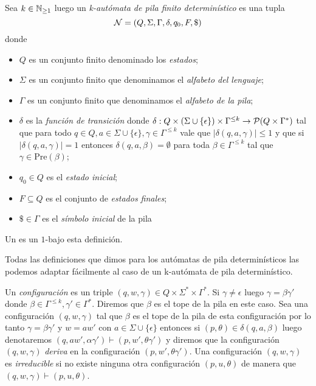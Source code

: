 \documentclass[tesis.tex]{subfiles}
\begin{document}
\begin{deff}
	Sea $k \in \mathbb{N}_{\ge 1}$ luego un \emph{k-autómata de pila finito determinístico} es una tupla 
	\[
	{\cal N } = (Q, \Sigma, \Gamma, \delta, q_0, F, \$)
	\]
	donde 
	\begin{itemize}
		\item $Q$ es un conjunto finito denominado los \emph{estados};
		\item $\Sigma$ es un conjunto finito que denominamos el \emph{alfabeto del lenguaje};
		\item $\Gamma$ es un conjunto finito que denominamos el \emph{alfabeto de la pila};
		\item $\delta$ es la \emph{función de transición} donde $\delta: Q  \times (\Sigma \cup \{ \epsilon \}) \times \Gamma^{\le k} \to {\cal P}(Q \times \Gamma^*)$
		tal que para todo $q \in Q, a \in \Sigma \cup \{\epsilon\}, \gamma \in \Gamma^{\le k}$ vale que $|\delta(q,a,\gamma)| \le 1$ y que si $|\delta(q,a,\gamma)| = 1$ entonces $\delta(q,a,\beta) = \emptyset$ para toda $\beta \in \Gamma^{\le k}$ tal que $\gamma \in \text{Pre}(\beta)$;
		\item $q_0 \in Q$ es el \emph{estado inicial};
		\item $F \subseteq Q$ es el conjunto de \emph{estados finales};
		\item $\$ \in \Gamma$ es el \emph{símbolo inicial} de la pila
	\end{itemize}
\end{deff}

\smallskip
\begin{obs}
	Un \APD es un $1$-\APD bajo esta definición.
\end{obs}

Todas las definiciones que dimos para los autómatas de pila determinísticos las podemos adaptar fácilmente al caso de un k-autómata de pila determinístico.


Un \emph{configuración} es un triple $(q,w,\gamma) \in Q \times \Sigma^{*} \times \Gamma^{*}$. 
Si $\gamma \neq \epsilon$ luego 
$\gamma = \beta \gamma'$ donde 
$\beta \in \Gamma^{\le k}, \gamma' \in \Gamma^{*}$. 
Diremos que $\beta$ es el tope de la pila en este caso.
Sea una configuración $(q,w,\gamma)$ tal que $\beta$ es el tope de la pila de esta configuración por lo tanto $\gamma = \beta \gamma'$ y $w = aw'$ con $a \in \Sigma \cup \{\epsilon\}$ 
entonces si $(p,\theta) \in \delta(q,a,\beta)$ luego denotaremos $(q,aw', \alpha\gamma') \vdash (p,w',\theta\gamma')$ y diremos que la configuración $(q,w,\gamma)$ \emph{deriva} en la configuración $(p,w',\theta\gamma')$.
Una configuración $(q,w,\gamma)$ es \emph{irreducible} si no existe ninguna otra configuración $(p,u,\theta)$ de manera que $(q,w,\gamma) \vdash (p,u,\theta)$.
\end{document}
